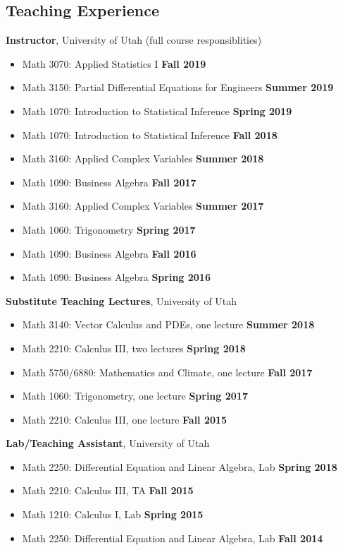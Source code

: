 \documentclass[margin,line]{res}
\begin{document}
\begin{resume}
\section{\sc Teaching Experience}
{\bf Instructor}, University of Utah (full course responsiblities)
\vspace*{.05in}
\begin{itemize}
\item[ ] Math 3070: Applied Statistics I \hfill {\bf Fall 2019}
\item[ ] Math 3150: Partial Differential Equations for Engineers \hfill {\bf Summer 2019}
\item[ ] Math 1070: Introduction to Statistical Inference \hfill {\bf Spring 2019}
\item[ ] Math 1070: Introduction to Statistical Inference \hfill {\bf Fall 2018}
\item[ ] Math 3160: Applied Complex Variables \hfill {\bf Summer 2018}
\item[ ] Math 1090: Business Algebra \hfill {\bf Fall 2017}
\item[ ] Math 3160: Applied Complex Variables \hfill {\bf Summer 2017}
\item[ ] Math 1060: Trigonometry \hfill {\bf Spring 2017}
\item[ ] Math 1090: Business Algebra \hfill {\bf Fall 2016}
\item[ ] Math 1090: Business Algebra \hfill {\bf Spring 2016}
\end{itemize}
{\bf Substitute Teaching Lectures}, University of Utah
\vspace*{.05in}
\begin{itemize}
\item[ ] Math 3140: Vector Calculus and PDEs, one lecture \hfill {\bf Summer 2018}
\item[ ] Math 2210: Calculus III, two lectures \hfill {\bf Spring 2018}
\item[ ] Math 5750/6880: Mathematics and Climate, one lecture \hfill {\bf Fall 2017}
\item[ ] Math 1060: Trigonometry, one lecture \hfill {\bf Spring 2017}
\item[ ] Math 2210: Calculus III, one lecture \hfill {\bf Fall 2015}
\end{itemize}
{\bf Lab/Teaching Assistant}, University of Utah
\vspace*{.05in}
\begin{itemize}
\item[ ] Math 2250: Differential Equation and Linear Algebra, Lab \hfill {\bf Spring 2018}
\item[ ] Math 2210: Calculus III, TA \hfill {\bf Fall 2015}
\item[ ] Math 1210: Calculus I, Lab \hfill {\bf Spring 2015}
\item[ ] Math 2250: Differential Equation and Linear Algebra, Lab \hfill {\bf Fall 2014}
\end{itemize}

\end{resume}
\end{document}
